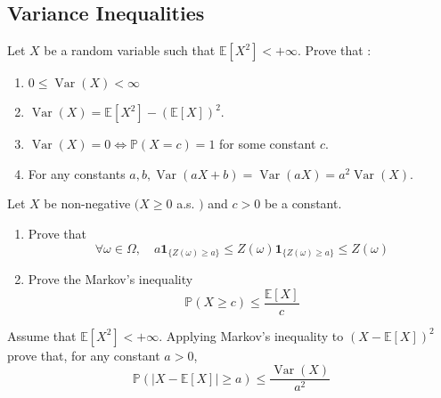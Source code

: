 \begin{center}
    \section*{Variance Inequalities}
\end{center}

\begin{Exercise}
    Let $X$ be a random variable such that $\mathbb{E}\left[X^2\right]<+\infty$. Prove that :
    \begin{enumerate}
        \item $0 \leq \operatorname{Var}(X)<\infty$
        \item $\operatorname{Var}(X)=\mathbb{E}\left[X^2\right]-(\mathbb{E}[X])^2$.
        \item $\operatorname{Var}(X)=0 \Longleftrightarrow \mathbb{P}(X=c)=1$ for some constant $c$.
        \item For any constants $a, b, \operatorname{Var}(a X+b)=\operatorname{Var}(a X)=a^2 \operatorname{Var}(X)$.
    \end{enumerate}
\end{Exercise}

\begin{Exercise}
    Let $X$ be non-negative $(X \geq 0$ a.s. $)$ and $c>0$ be a constant.
    \begin{enumerate}
        \item Prove that
              $$\forall \omega \in \Omega, \quad a \mathbf{1}_{\{Z(\omega) \geqslant a\}} \leqslant Z(\omega) \mathbf{1}_{\{Z(\omega) \geqslant a\}} \leqslant Z(\omega)$$
        \item Prove the Markov's inequality
              $$
                  \mathbb{P}(X \geq c) \leq \frac{\mathbb{E}[X]}{c}
              $$
    \end{enumerate}
\end{Exercise}

\begin{Exercise}
    Assume that $\mathbb{E}\left[X^2\right]<+\infty$. Applying Markov's inequality to $(X-\mathbb{E}[X])^2$ prove that, for any constant $a>0$,
    $$
        \mathbb{P}(|X-\mathbb{E}[X]| \geq a) \leq \frac{\operatorname{Var}(X)}{a^2}
    $$
\end{Exercise}